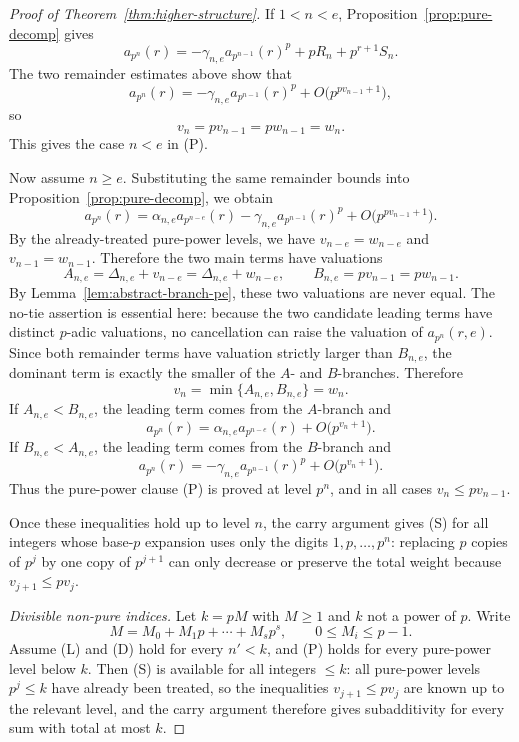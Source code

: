 \documentclass[10pt,a4paper]{amsart}
\newcommand{\bigo}{O}
\begin{document}
\begin{proof}[Proof of Theorem~\ref{thm:higher-structure}]
If $1<n<e$, Proposition~\ref{prop:pure-decomp} gives
\[
        a_{p^n}(r)=-\gamma_{n,e}a_{p^{n-1}}(r)^p+pR_n+p^{r+1}S_n.
\]
The two remainder estimates above show that
\[
        a_{p^n}(r)=-\gamma_{n,e}a_{p^{n-1}}(r)^p+\bigo\bigl(p^{p v_{n-1}+1}\bigr),
\]
so
\[
        v_n=p v_{n-1}=p w_{n-1}=w_n.
\]
This gives the case $n<e$ in (P).

Now assume $n\ge e$.  Substituting the same remainder bounds into Proposition~\ref{prop:pure-decomp}, we obtain
\[
        a_{p^n}(r)=\alpha_{n,e}a_{p^{n-e}}(r)-\gamma_{n,e}a_{p^{n-1}}(r)^p+\bigo\bigl(p^{p v_{n-1}+1}\bigr).
\]
By the already-treated pure-power levels, we have $v_{n-e}=w_{n-e}$ and $v_{n-1}=w_{n-1}$.  Therefore the two main terms have valuations
\[
        A_{n,e}=\Delta_{n,e}+v_{n-e}=\Delta_{n,e}+w_{n-e},
        \qquad
        B_{n,e}=p v_{n-1}=p w_{n-1}.
\]
By Lemma~\ref{lem:abstract-branch-pe}, these two valuations are never equal.  The no-tie assertion is essential here: because the two candidate leading terms have distinct $p$-adic valuations, no cancellation can raise the valuation of $a_{p^n}(r,e)$.  Since both remainder terms have valuation strictly larger than $B_{n,e}$, the dominant term is exactly the smaller of the $A$- and $B$-branches.  Therefore
\[
        v_n=\min\{A_{n,e},B_{n,e}\}=w_n.
\]
If $A_{n,e}<B_{n,e}$, the leading term comes from the $A$-branch and
\[
        a_{p^n}(r)=\alpha_{n,e}a_{p^{n-e}}(r)+\bigo\bigl(p^{v_n+1}\bigr).
\]
If $B_{n,e}<A_{n,e}$, the leading term comes from the $B$-branch and
\[
        a_{p^n}(r)=-\gamma_{n,e}a_{p^{n-1}}(r)^p+\bigo\bigl(p^{v_n+1}\bigr).
\]
Thus the pure-power clause (P) is proved at level $p^n$, and in all cases $v_n\le p v_{n-1}$.

Once these inequalities hold up to level $n$, the carry argument gives (S) for all integers whose base-$p$ expansion uses only the digits $1,p,\ldots,p^n$: replacing $p$ copies of $p^j$ by one copy of $p^{j+1}$ can only decrease or preserve the total weight because $v_{j+1}\le p v_j$.

\smallskip
\noindent\emph{Divisible non-pure indices.}
Let $k=pM$ with $M\ge1$ and $k$ not a power of $p$.  Write
\[
        M=M_0+M_1p+\cdots+M_sp^s,
        \qquad
        0\le M_i\le p-1.
\]
Assume (L) and (D) hold for every $n'<k$, and (P) holds for every pure-power level below $k$.  Then (S) is available for all integers $\le k$: all pure-power levels $p^j\le k$ have already been treated, so the inequalities $v_{j+1}\le p v_j$ are known up to the relevant level, and the carry argument therefore gives subadditivity for every sum with total at most $k$.


\end{proof}
\end{document}
